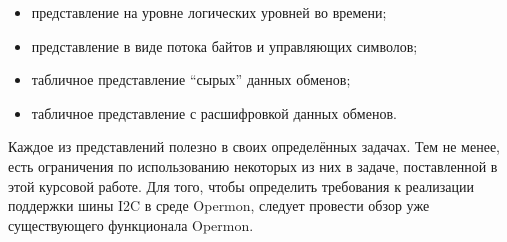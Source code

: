 \begin{itemize}
 \item представление на уровне логических уровней во времени;
 \item представление в виде потока байтов и управляющих символов;
 \item табличное представление ``сырых'' данных обменов;
 \item табличное представление с расшифровкой данных обменов.
\end{itemize}

Каждое из представлений полезно в своих определённых задачах. Тем не менее, есть ограничения по использованию некоторых из них в задаче, поставленной в этой курсовой работе. Для того, чтобы определить требования к реализации поддержки шины I2C в среде Opermon, следует провести обзор уже существующего функционала Opermon.
